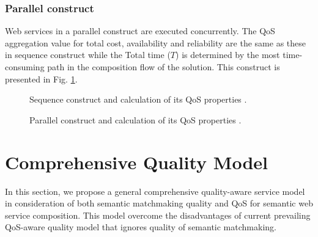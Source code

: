 \documentclass{llncs}
\begin{document}
\subsubsection{Parallel construct}
Web services in a parallel construct are executed concurrently. The QoS aggregation value for total cost, availability and reliability are the same as these in sequence construct while the Total time ($T$) is determined by the most time-consuming path in the composition flow of the solution. This construct is presented in Fig. \ref{parallel}.

\begin{figure}[h]
\centerline{
}
\caption{Sequence construct and calculation of its QoS properties
\cite{yu2013adaptive}.}
\label{sequence}
\vspace{0.2cm}
\centerline{
}
\caption{Parallel construct and calculation of its QoS properties
\cite{yu2013adaptive}.}
\label{parallel}
\end{figure}





\section{Comprehensive Quality Model}\label{Comprehensive_Quality_Model}
In this section, we propose a general comprehensive quality-aware service model in consideration of both semantic matchmaking quality and QoS for semantic web service composition. This model overcome the disadvantages of current prevailing QoS-aware quality model that ignores quality of semantic matchmaking.
\end{document}
